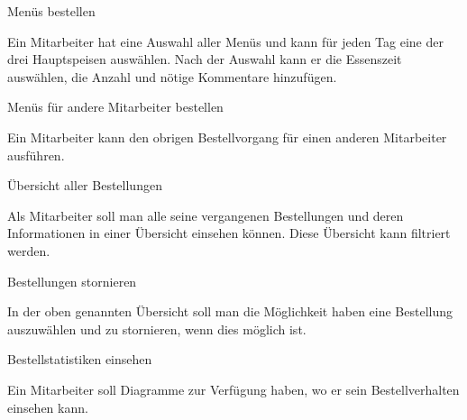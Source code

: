 \begin{compactitem}
    \item Menüs bestellen
    \begin{compactitem}
        \item Ein Mitarbeiter hat eine Auswahl aller Menüs und kann für jeden Tag eine der drei Hauptspeisen auswählen. Nach der Auswahl kann er die Essenszeit auswählen, die Anzahl und nötige Kommentare hinzufügen.
    \end{compactitem}
    \item Menüs für andere Mitarbeiter bestellen
    \begin{compactitem}
        \item Ein Mitarbeiter kann den obrigen Bestellvorgang für einen anderen Mitarbeiter ausführen. 
    \end{compactitem}
    \item Übersicht aller Bestellungen
    \begin{compactitem}
        \item Als Mitarbeiter soll man alle seine vergangenen Bestellungen und deren Informationen in einer Übersicht einsehen können. Diese Übersicht kann filtriert werden.
    \end{compactitem}
    \item Bestellungen stornieren
    \begin{compactitem}
        \item In der oben genannten Übersicht soll man die Möglichkeit haben eine Bestellung auszuwählen und zu stornieren, wenn dies möglich ist.
    \end{compactitem}
    \item Bestellstatistiken einsehen
    \begin{compactitem}
        \item Ein Mitarbeiter soll Diagramme zur Verfügung haben, wo er sein Bestellverhalten einsehen kann.
    \end{compactitem}
\end{compactitem}
\pagebreak


